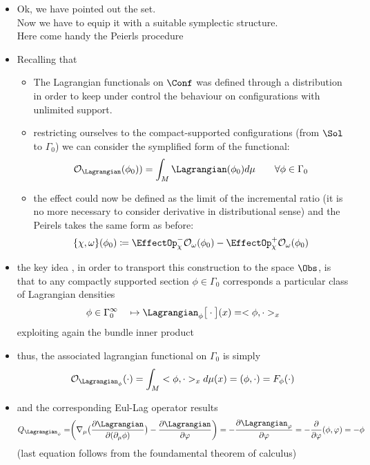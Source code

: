 \documentclass[a4paper,11pt]{scrartcl}
\begin{document}
    \begin{itemize}
        \item Ok, we have pointed out the set.\\
        Now we have to equip it with a suitable symplectic structure.\\
        Here come handy the Peierls procedure
        \item Recalling that
        \begin{itemize}
            \item The Lagrangian functionals on $\Conf$ was defined through a distribution in order to keep under control the behaviour on configurations with unlimited support.
            \item restricting ourselves to the compact-supported configurations (from $\Sol$ to $\Gamma_0$) we can consider the symplified form of the functional:
            $$ \mathcal{O}_\Lagrangian ( \phi_0) ) =  \int_M \Lagrangian(\phi_0) d \mu \qquad \forall \phi \in \Gamma_0$$
            \item the effect could now be defined as the limit of the incremental ratio (it is no more necessary to consider derivative in distributional sense) and the Peirels takes the same form as before:
            $$\{\chi, \omega \}(\phi_0) \coloneqq \EffectOp_\chi^- \mathcal{O}_\omega (\phi_0) - \EffectOp_\chi^+ \mathcal{O}_\omega(\phi_0) $$
        \end{itemize}
        \item the key idea , in order to transport this construction to the space $\Obs$, is that to any compactly supported section $\phi \in \Gamma_0$ corresponds a particular class of Lagrangian densities
        $$ \phi \in \Gamma_0^\infty \quad \mapsto \Lagrangian_\phi \big[\cdot \big] ( x ) = <\phi, \cdot>_x $$
        exploiting again the bundle inner product
        \item thus, the associated lagrangian functional on $\Gamma_0$ is simply
        $$                             \mathcal{O}_{\Lagrangian_\phi} (\cdot ) = \int_M  <\phi, \cdot>_x d\mu(x) = (\phi, \cdot) = F_\phi (\cdot)$$
        \item and the corresponding Eul-Lag operator results
        $$Q_{\Lagrangian_\phi}= \biggr( \nabla_\mu \big( \frac{\partial \Lagrangian}{\partial ( \partial_\mu \phi)} \big) - \frac{\partial \Lagrangian}{\partial \varphi} \biggr) = - \frac{\partial \Lagrangian_\varphi}{\partial \varphi} = -\frac{\partial}{\partial \varphi} (\phi, \varphi) = -\phi$$
        (last equation follows from the foundamental theorem of calculus)\\

\end{itemize}
\end{document}
